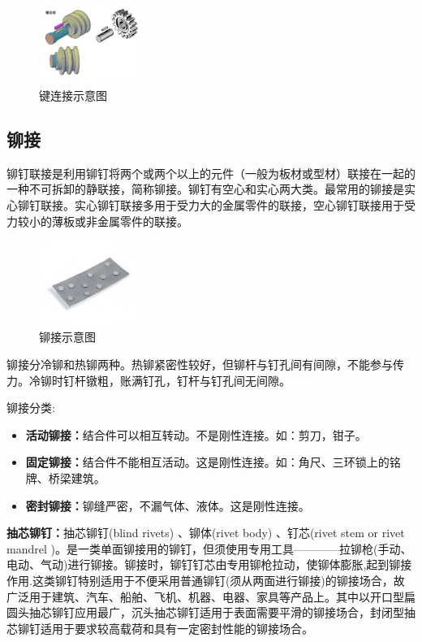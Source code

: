\documentclass[UTF8]{article} %
\begin{document}
\begin{figure}[h]
  \centering
  \includegraphics[width=0.3\textwidth]{jian1.png}
  \caption{键连接示意图}
\end{figure}


\subsection{铆接}

铆钉联接是利用铆钉将两个或两个以上的元件（一般为板材或型材）联接在一起的一种不可拆卸的静联接，简称铆接。铆钉有空心和实心两大类。最常用的铆接是实心铆钉联接。实心铆钉联接多用于受力大的金属零件的联接，空心铆钉联接用于受力较小的薄板或非金属零件的联接。

\begin{figure}[h]
  \centering
  \includegraphics[width=0.3\textwidth]{mao1.png}
  \caption{铆接示意图}
\end{figure}

铆接分冷铆和热铆两种。热铆紧密性较好，但铆杆与钉孔间有间隙，不能参与传力。冷铆时钉杆镦粗，账满钉孔，钉杆与钉孔间无间隙。

铆接分类:
\begin{itemize}
  \item  \textbf{活动铆接：}结合件可以相互转动。不是刚性连接。如：剪刀，钳子。
  \item  \textbf{固定铆接：}结合件不能相互活动。这是刚性连接。如：角尺、三环锁上的铭牌、桥梁建筑。
  \item  \textbf{密封铆接：}铆缝严密，不漏气体、液体。这是刚性连接。
\end{itemize}

\textbf{抽芯铆钉：}抽芯铆钉(blind rivets) 、铆体(rivet body) 、钉芯(rivet stem or rivet mandrel )。是一类单面铆接用的铆钉，但须使用专用工具————拉铆枪(手动、电动、气动)进行铆接。铆接时，铆钉钉芯由专用铆枪拉动，使铆体膨胀,起到铆接作用.这类铆钉特别适用于不便采用普通铆钉(须从两面进行铆接)的铆接场合，故广泛用于建筑、汽车、船舶、飞机、机器、电器、家具等产品上。其中以开口型扁圆头抽芯铆钉应用最广，沉头抽芯铆钉适用于表面需要平滑的铆接场合，封闭型抽芯铆钉适用于要求较高载荷和具有一定密封性能的铆接场合。
\end{document}
